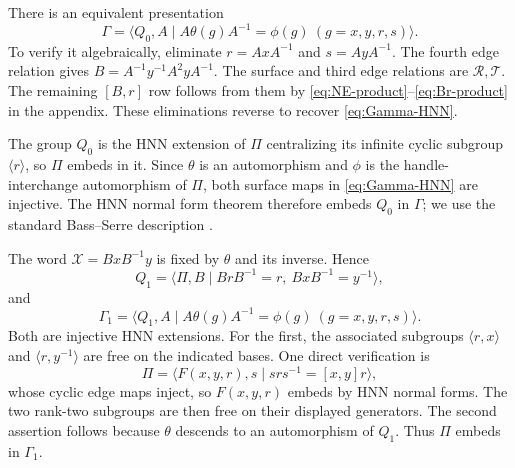 \documentclass[11pt]{amsart}
\theoremstyle{definition}
\theoremstyle{remark}
\begin{document}
There is an equivalent presentation
\begin{equation}\label{eq:Gamma-HNN}
 \Gamma=\langle Q_0,A\mid A\theta(g)A^{-1}=\phi(g)
                       \ (g=x,y,r,s)\rangle.
\end{equation}
To verify it algebraically, eliminate $r=AxA^{-1}$ and
$s=AyA^{-1}$. The fourth edge relation gives
$B=A^{-1}y^{-1}A^2yA^{-1}$. The surface and third edge relations
are $\mathcal R,\mathcal T$. The remaining $[B,r]$ row follows
from them by \eqref{eq:NE-product}--\eqref{eq:Br-product} in
the appendix. These eliminations reverse to recover
\eqref{eq:Gamma-HNN}.

The group $Q_0$ is the HNN extension of $\Pi$ centralizing its
infinite cyclic subgroup $\langle r\rangle$, so $\Pi$ embeds
in it. Since $\theta$ is an automorphism and $\phi$ is the
handle-interchange automorphism of $\Pi$, both surface maps in
\eqref{eq:Gamma-HNN} are injective. The HNN normal form theorem
therefore embeds $Q_0$ in $\Gamma$; we use the standard
Bass--Serre description \cite{Serre80}.

The word $\mathcal X=BxB^{-1}y$ is fixed by $\theta$ and its
inverse. Hence
\[
 Q_1=\langle\Pi,B\mid BrB^{-1}=r,\ BxB^{-1}=y^{-1}\rangle,
\]
and
\begin{equation}\label{eq:Gamma1-HNN}
 \Gamma_1=\langle Q_1,A\mid A\theta(g)A^{-1}=\phi(g)
                             \ (g=x,y,r,s)\rangle.
\end{equation}
Both are injective HNN extensions. For the first, the associated
subgroups $\langle r,x\rangle$ and $\langle r,y^{-1}\rangle$
are free on the indicated bases. One direct verification is
\[
 \Pi=\langle F(x,y,r),s\mid srs^{-1}=[x,y]r\rangle,
\]
whose cyclic edge maps inject, so $F(x,y,r)$ embeds by HNN normal
forms. The two rank-two subgroups are then free on their displayed
generators. The second assertion follows because $\theta$ descends
to an automorphism of $Q_1$. Thus $\Pi$ embeds in $\Gamma_1$.
\end{document}
